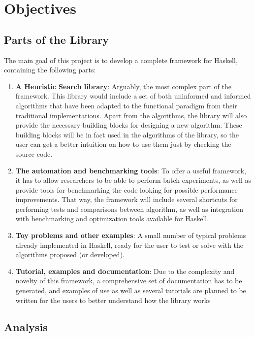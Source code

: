 \section{Objectives}

\subsection{Parts of the Library}

The main goal of this project is to develop a complete framework for Haskell,
containing the following parts:

\begin{enumerate}
\item \textbf{A Heuristic Search library}: Arguably, the most complex part of
  the framework. This library would include a set of both uninformed and
  informed algorithms that have been adapted to the functional paradigm from
  their traditional implementations. Apart from the algorithms, the library
  will also provide the necessary building blocks for designing a new
  algorithm. These building blocks will be in fact used in the algorithms of
  the library, so the user can get a better intuition on how to use them just
  by checking the source code.
\item \textbf{The automation and benchmarking tools}: To offer a useful
  framework, it has to allow researchers to be able to perform batch
  experiments, as well as provide tools for benchmarking the code looking for
  possible performance improvements. That way, the framework will include
  several shortcuts for performing tests and comparisons between algorithm, as
  well as integration with benchmarking and optimization tools available for
  Haskell.
\item \textbf{Toy problems and other examples}: A small number of typical
  problems already implemented in Haskell, ready for the user to test or solve
  with the algorithms proposed (or developed).
\item \textbf{Tutorial, examples and documentation}: Due to the complexity and
  novelty of this framework, a comprehensive set of documentation has to be
  generated, and examples of use as well as several tutorials are planned to be
  written for the users to better understand how the library works
\end{enumerate}

\subsection{Analysis}

